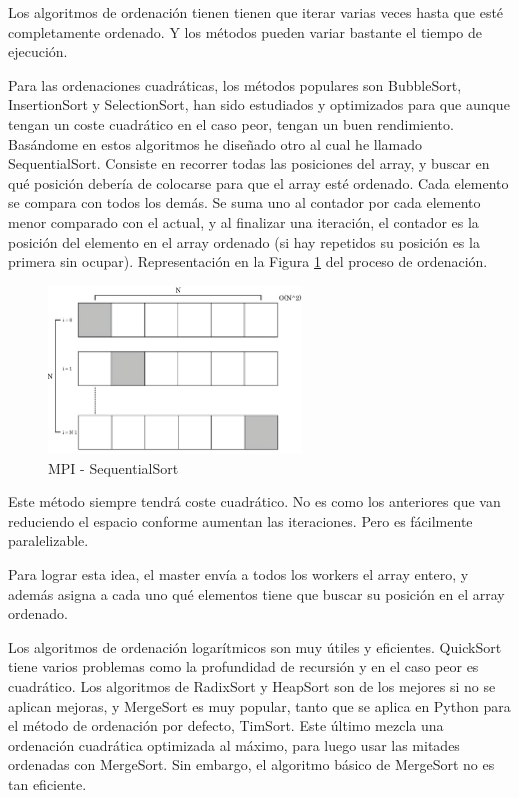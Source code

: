	
	Los algoritmos de ordenación tienen tienen que iterar varias veces hasta que esté completamente ordenado. Y los métodos pueden variar bastante el tiempo de ejecución.
	
	Para las ordenaciones cuadráticas, los métodos populares son BubbleSort, InsertionSort y SelectionSort, han sido estudiados y optimizados para que aunque tengan un coste cuadrático en el caso peor, tengan un buen rendimiento. Basándome en estos algoritmos he diseñado otro al cual he llamado SequentialSort. Consiste en recorrer todas las posiciones del array, y buscar en qué posición debería de colocarse para que el array esté ordenado. Cada elemento se compara con todos los demás. Se suma uno al contador por cada elemento menor comparado con el actual, y al finalizar una iteración, el contador es la posición del elemento en el array ordenado (si hay repetidos su posición es la primera sin ocupar). Representación en la Figura \ref{fig:sequentialsortmpi} del proceso de ordenación.







	\begin{figure}[!h]
		\centering
		\includegraphics[width=0.6\textwidth]{images/chapter_3/sequentialsort_mpi}
		\caption{MPI - SequentialSort}
		\label{fig:sequentialsortmpi}
	\end{figure}
	
	Este método siempre tendrá coste cuadrático. No es como los anteriores que van reduciendo el espacio conforme aumentan las iteraciones. Pero es fácilmente paralelizable. 
	
	Para lograr esta idea, el master envía a todos los workers el array entero, y además asigna a cada uno qué elementos tiene que buscar su posición en el array ordenado.



	Los algoritmos de ordenación logarítmicos son muy útiles y eficientes. QuickSort tiene varios problemas como la profundidad de recursión y en el caso peor es cuadrático. Los algoritmos de RadixSort y HeapSort son de los mejores si no se aplican mejoras,  y MergeSort es muy popular, tanto que se aplica en Python para el método de ordenación por defecto, TimSort\cite{auger2015merge}. Este último mezcla una ordenación cuadrática optimizada al máximo, para luego usar las mitades ordenadas con MergeSort. Sin embargo, el algoritmo básico de MergeSort no es tan eficiente.
	
